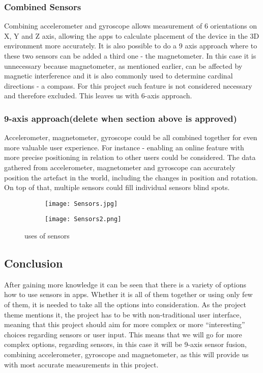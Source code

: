 \subsubsection*{Combined Sensors}
Combining accelerometer and gyroscope allows measurement of 6 orientations on X, Y and Z axis, allowing the apps to calculate placement of the device in the 3D environment more accurately.
It is also possible to do a 9 axis approach where to these two sensors can be added a third one - the magnetometer. In this case it is unnecessary because magnetometer, as mentioned earlier, can be affected by magnetic interference and it is also commonly used to determine cardinal directions -  a compass. For this project such feature is not considered necessary and therefore excluded. This leaves us with 6-axis approach.

\subsubsection*{9-axis approach(delete when section above is approved)}
Accelerometer, magnetometer, gyroscope could be all combined together for even more valuable user experience. For instance - enabling an online feature with more precise positioning in relation to other users could be considered. The data gathered from accelerometer, magnetometer and gyroscope can accurately position the artefact in the world, including the changes in position and rotation. On top of that, multiple sensors could fill individual sensors blind spots. 

\begin{figure}[H]
\begin{subfigure}{.5\textwidth}
  \centering
  \texttt{[image: Sensors.jpg]}
\end{subfigure}%
\begin{subfigure}{.5\textwidth}
  \centering
  \texttt{[image: Sensors2.png]}
\end{subfigure}
\caption{uses of sensors}
\end{figure}


\subsection{Conclusion}
After gaining more knowledge it can be seen that there is a variety of options how to use sensors in apps. Whether it is all of them together or using only few of them, it is needed to take all the options into consideration. As the project theme mentions it, the project has to be with non-traditional user interface, meaning that this project should aim for more complex or more “interesting” choices regarding sensors or user input. This means that we will go for more complex options, regarding sensors, in this case it will be 9-axis sensor fusion, combining accelerometer, gyroscope and magnetometer, as this will provide us with most accurate measurements in this project.


